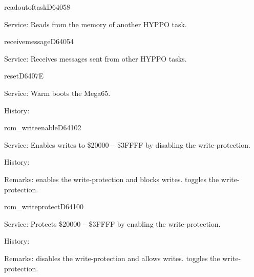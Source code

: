 \begin{hyppotrap}{readoutoftask}{D640}{58}
\item [Service:]
  Reads from the memory of another HYPPO task.
\notimplemented
\end{hyppotrap}


\begin{hyppotrap}{receivemessage}{D640}{54}
\item [Service:]
  Receives messages sent from other HYPPO tasks.
\notimplemented
\end{hyppotrap}


\newpage
\begin{hyppotrap}{reset}{D640}{7E}
\item [Service:]
  Warm boots the Mega65.
\item [History:]
\end{hyppotrap}


\newpage
\begin{hyppotrap}{rom\_writeenable}{D641}{02}
\item [Service:]
  Enables writes to \$20000 -- \$3FFFF by disabling the write-protection.
\item [History:]
\item [Remarks:]
   enables the write-protection and blocks writes.
   toggles the write-protection.
\end{hyppotrap}


\newpage
\begin{hyppotrap}{rom\_writeprotect}{D641}{00}
\item [Service:]
  Protects \$20000 -- \$3FFFF by enabling the write-protection.
\item [History:]
\item [Remarks:]
   disables the write-protection and allows writes.
   toggles the write-protection.
\end{hyppotrap}


